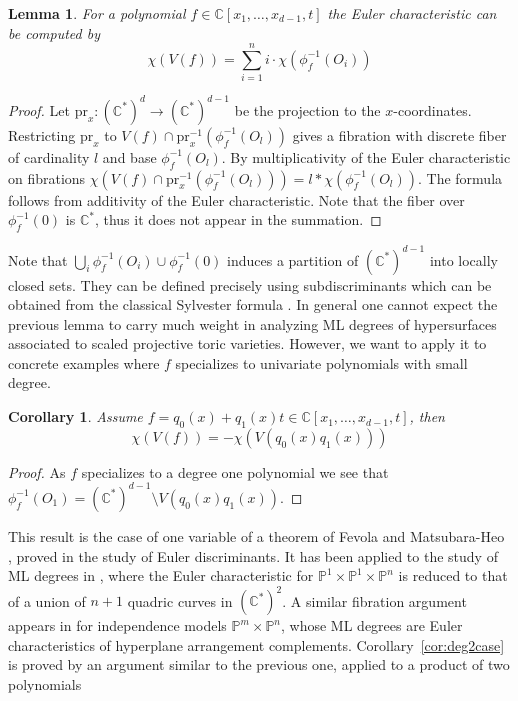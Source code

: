 \documentclass[12pt,reqno]{amsart}   	%
\theoremstyle{plain}
\newtheorem{lemma}[theorem]{Lemma}
\newtheorem{corollary}[theorem]{Corollary}
\theoremstyle{definition}
\theoremstyle{remark}
\newcommand{\C}{\mathbb{C}}
\newcommand{\pr}{\mathrm{pr}}
\begin{document}
\begin{lemma}       
    For a polynomial $f\in \C[x_1,\dots,x_{d-1},t]$ the Euler characteristic can be computed by
    \[
        \chi (V(f)) = \sum _{i=1}^{n} i \cdot \chi(\phi_f^{-1}(O_i))
    \]
\end{lemma}
\begin{proof}
    Let $\pr_x \colon (\C^\ast)^d \to (\C^\ast)^{d-1}$ be the projection to the $x$-coordinates. Restricting $\pr_x$ to $V(f)\cap\pr_x^{-1}(\phi_f^{-1}(O_l))$ gives a fibration with discrete fiber of cardinality $l$ and base $\phi_f^{-1}(O_l)$. By multiplicativity of the Euler characteristic on fibrations $\chi(V(f)\cap\pr_x^{-1}(\phi_f^{-1}(O_l)))= l*\chi(\phi_f^{-1}(O_l))$. The formula follows from additivity of the Euler characteristic. Note that the fiber over $\phi_f^{-1}(0)$ is $\C^\ast$, thus it does not appear in the summation.
\end{proof}
Note that $\bigcup_i \phi_f^{-1}(O_i) \cup  \phi_f^{-1}(0)$ induces a partition of $(\C^\ast)^{d-1}$ into locally closed sets. They can be defined precisely using subdiscriminants which can be obtained from the classical Sylvester formula \cite{chen2025}.
In general one cannot expect the previous lemma to carry much weight in analyzing ML degrees of hypersurfaces associated to scaled projective toric varieties. However, we want to apply it to concrete examples where $f$ specializes to univariate polynomials with small degree.
\begin{corollary}\label{degree 1 case}
    Assume $f= q_0(x)+q_1(x)t\in\C[x_1,\dots,x_{d-1},t]$, then 
    \[
        \chi(V(f)) = -\chi(V(q_0(x)q_1(x)))
    \]
\end{corollary}
\begin{proof}
    As $f$ specializes to a degree one polynomial we see that $\phi_f^{-1}(O_1)= (\C^\ast)^{d-1}\setminus V(q_0(x)q_1(x))$.
\end{proof}
This result is the case of one variable of a theorem of Fevola and Matsubara-Heo
\cite[Theorem~2.2]{fevola2024}, proved in the study of Euler discriminants.
It has been applied to the study of ML degrees in \cite{hosten2026}, where the
Euler characteristic for $\mathbb{P}^1 \times \mathbb{P}^1\times \mathbb{P}^n$ is
reduced to that of a union of $n+1$ quadric curves in $(\C^\ast)^2$. A similar
fibration argument appears in \cite{clarke2024} for independence models
$\mathbb{P}^{m}\times\mathbb{P}^{n}$, whose ML degrees are Euler characteristics
of hyperplane arrangement complements. Corollary~\ref{cor:deg2case} is proved by
an argument similar to the previous one, applied to a product of two polynomials
\end{document}
